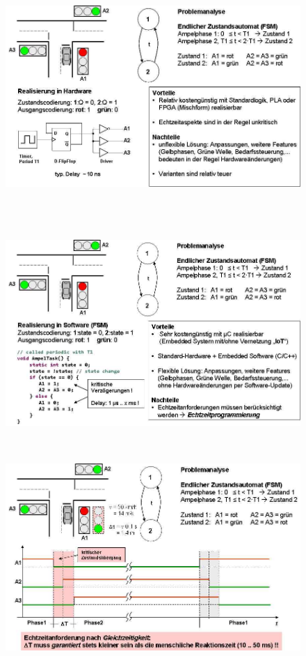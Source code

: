 \begin{figure}[h]
    \centering
    \includegraphics[width=14cm, height=9cm]{Images/image12.png}
    \label{fig:Fig 3}
\end{figure}

\begin{figure}[h]
    \centering
    \includegraphics[width=14cm, height=8cm]{Images/image13.png}
    \label{fig:Fig 3}
\end{figure}

\begin{figure}[h]
    \centering
    \includegraphics[width=14cm, height=8cm]{Images/image14.png}
    \label{fig:Fig 3}
\end{figure}

